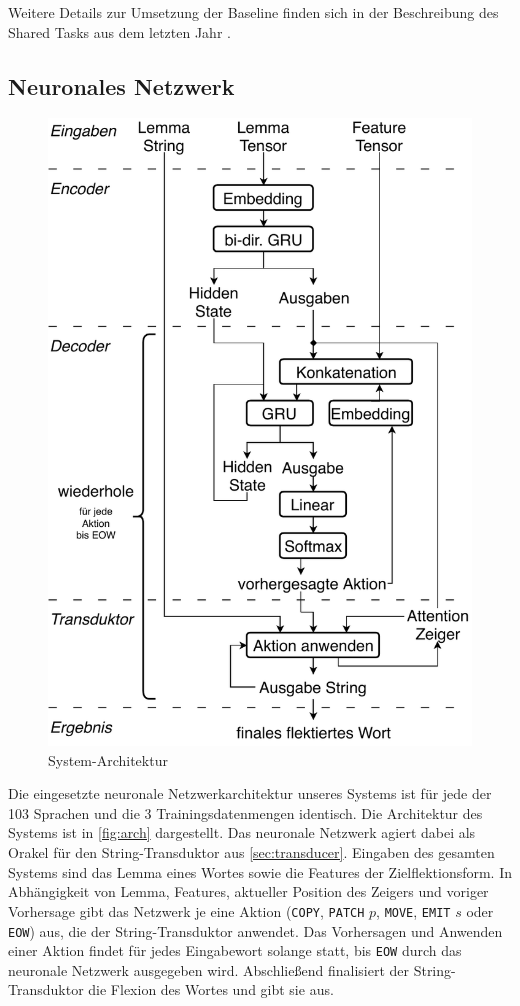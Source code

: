 \documentclass[a4paper]{article}
\newcommand{\action}[1]{\texttt{#1}}
\begin{document}
Weitere Details zur Umsetzung der Baseline finden sich in der Beschreibung des Shared Tasks aus dem letzten Jahr \cite{sigmorphon:st2017}.

\subsection{Neuronales Netzwerk}
\begin{figure}
\centering
\includegraphics[width=\linewidth]{architecture_de}
\caption{System-Architektur}
\label{fig:arch}
\end{figure}
Die eingesetzte neuronale Netzwerkarchitektur unseres Systems ist für jede der 103 Sprachen und die 3 Trainingsdatenmengen identisch.
Die Architektur des Systems ist in \autoref{fig:arch} dargestellt. Das neuronale Netzwerk agiert dabei als Orakel für den String-Transduktor aus \autoref{sec:transducer}.
Eingaben des gesamten Systems sind das Lemma eines Wortes sowie die Features der Zielflektionsform.
In Abhängigkeit von Lemma, Features, aktueller Position des Zeigers und voriger Vorhersage gibt das Netzwerk je eine Aktion (\action{COPY}, \action{PATCH} $p$, \action{MOVE}, \action{EMIT} $s$ oder \action{EOW}) aus, die der String-Transduktor anwendet.
Das Vorhersagen und Anwenden einer Aktion findet für jedes Eingabewort solange statt, bis \action{EOW} durch das neuronale Netzwerk ausgegeben wird. Abschließend finalisiert der String-Transduktor die Flexion des Wortes und gibt sie aus.
\end{document}
